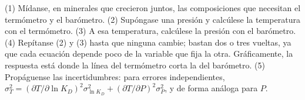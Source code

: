 \begin{method}\label{met:b2:pt-paths:intersection}
(1) Mídanse, en minerales que crecieron juntos, las composiciones que necesitan el termómetro y el
barómetro. (2) Supóngase una presión y calcúlese la temperatura con el termómetro.
(3) A esa temperatura, calcúlese la presión con el barómetro. (4) Repítanse (2) y (3)
hasta que ninguna cambie; bastan dos o tres vueltas, ya que cada ecuación depende poco de
la variable que fija la otra. Gráficamente, la respuesta está donde la línea del
termómetro corta la del barómetro. (5) Propáguense las incertidumbres: para
errores independientes, $\sigma_T^2 = (\partial T/\partial\ln K_D)^2\sigma_{\ln K_D}^2 +
(\partial T/\partial P)^2\sigma_P^2$, y de forma análoga para $P$.
\end{method}

